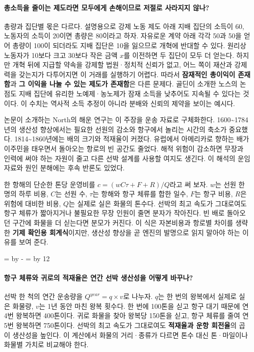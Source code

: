 \documentclass[10pt,a4paper]{article}
\newcommand{\ReserveQuestionSpace}{%
  \par\begingroup
  \dimen0=\pagegoal \advance\dimen0 by -\pagetotal
  \dimen2=\baselineskip \multiply\dimen2 by 12
  \ifdim\dimen0<\dimen2 \newpage\fi
  \endgroup}
\begin{document}
\paragraph{총소득을 줄이는 제도라면 모두에게 손해이므로 저절로 사라지지 않나?}
총량과 집단별 몫은 다르다. 설명용으로 강제 노동 제도 아래 지배 집단의 소득이 60, 노동자의 소득이 20이면 총량은 80이라고 하자. 자유로운 계약 아래 각각 50과 50을 얻어 총량이 100이 되더라도 지배 집단은 10을 잃으므로 개혁에 반대할 수 있다. 원리상 노동자가 10보다 크고 30보다 작은 금액 $x$를 이전하면 두 집단이 모두 더 얻는다. 하지만 개혁 뒤에 지급할 약속을 강제할 법원·정치적 신뢰가 없고, 어느 쪽이 재산과 강제력을 갖는지가 다투어지면 이 거래를 실행하기 어렵다. 따라서 \textbf{잠재적인 총이익이 존재함}과 \textbf{그 이익을 나눌 수 있는 제도가 존재함}은 다른 문제다. 골딘이 소개한 노스의 논점도 지배 집단에 유리한 노예제·농노제가 잠재 소득을 낮추어도 지속될 수 있다는 것이다. 이 수치는 역사적 소득 추정이 아니라 분배와 신뢰의 제약을 보이는 예시다.\par

논문이 소개하는 North의 해운 연구는 이 주장을 운송 자료로 구체화한다. 1600\textasciitilde{}1784년의 생산성 향상에서는 필요한 선원의 감소와 항구에서 놀리는 시간의 축소가 중요했다. 1814\textasciitilde{}1860년에는 배의 크기와 적재율이 커졌다. 유럽에서 아메리카로 향하는 배가 이주민을 태우면서 돌아오는 항로의 빈 공간도 줄었다. 해적 위험이 감소하면 무장과 인력에 써야 하는 자원이 줄고 다른 선박 설계를 사용할 여지도 생긴다. 이 해석의 운임 자료와 원인 분해에는 후속 반론도 있었다.\par

한 항해의 단순한 톤당 운영비를 $c=(wC\tau+F+R)/Q$라고 써 보자. $w$는 선원 한 명의 하루 비용, $C$는 선원 수, $\tau$는 항해와 항구 체류를 합한 일수, $F$는 항구 비용, $R$은 위험에 대비한 비용, $Q$는 실제로 실은 화물의 톤수다. 선박의 최고 속도가 그대로여도 항구 체류가 짧아지거나 불필요한 무장 인원이 줄면 분자가 작아진다. 빈 배로 돌아오던 구간에 화물을 더 싣는다면 분모가 커진다. 이 식은 자본비용과 항로별 차이를 생략한 \textbf{기제 확인용 회계식}이지만, 생산성 향상을 곧 엔진의 발명으로 읽지 말아야 하는 이유를 보여 준다.\par

\ReserveQuestionSpace
\paragraph{항구 체류와 귀로의 적재율은 연간 선박 생산성을 어떻게 바꾸나?}
선박 한 척의 연간 운송량을 $Q^{year}=q\times v$로 나누자. $q$는 한 번의 왕복에서 실제로 실은 화물량, $v$는 1년 동안 마친 왕복 횟수다. 한 번에 100톤을 싣고 항구 대기 때문에 연 4번 왕복하면 400톤이다. 귀로 화물을 찾아 왕복당 150톤을 싣고, 항구 체류를 줄여 연 5번 왕복하면 750톤이다. 선박의 최고 속도가 그대로여도 \textbf{적재율과 운항 회전율}의 곱이 생산성을 높인다. 이 계산에서 화물의 거리·종류가 다르면 톤수 대신 톤·마일이나 화물별 가치로 비교해야 한다.\par
\end{document}
